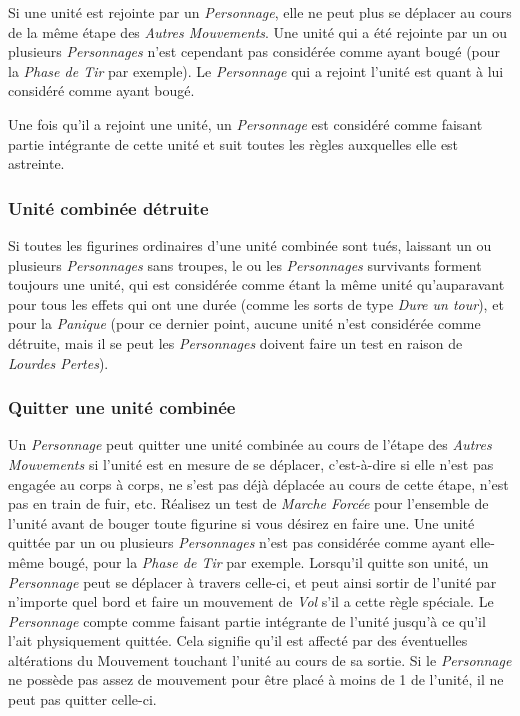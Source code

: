 Si une unité est rejointe par un \emph{Personnage}, elle ne peut plus se déplacer au cours de la même étape des \emph{Autres Mouvements}. Une unité qui a été rejointe par un ou plusieurs \emph{Personnages} n'est cependant pas considérée comme ayant bougé (pour la \emph{Phase de Tir} par exemple). Le \emph{Personnage} qui a rejoint l'unité est quant à lui considéré comme ayant bougé.

Une fois qu'il a rejoint une unité, un \emph{Personnage} est considéré comme faisant partie intégrante de cette unité et suit toutes les règles auxquelles elle est astreinte.

\subsubsection*{Unité combinée détruite}

Si toutes les figurines ordinaires d'une unité combinée sont tués, laissant un ou plusieurs \emph{Personnages} sans troupes, le ou les \emph{Personnages} survivants forment toujours une unité, qui est considérée comme étant la même unité qu'auparavant pour tous les effets qui ont une durée (comme les sorts de type \emph{Dure un tour}), et pour la \emph{Panique} (pour ce dernier point, aucune unité n'est considérée comme détruite, mais il se peut les \emph{Personnages} doivent faire un test en raison de \emph{Lourdes Pertes}).

\subsubsection*{Quitter une unité combinée}

Un \emph{Personnage} peut quitter une unité combinée au cours de l'étape des \emph{Autres Mouvements} si l'unité est en mesure de se déplacer, c'est-à-dire si elle n'est pas engagée au corps à corps, ne s'est pas déjà déplacée au cours de cette étape, n'est pas en train de fuir, etc. Réalisez un test de \emph{Marche Forcée} pour l'ensemble de l'unité avant de bouger toute figurine si vous désirez en faire une. Une unité quittée par un ou plusieurs \emph{Personnages} n'est pas considérée comme ayant elle-même bougé, pour la \emph{Phase de Tir} par exemple. Lorsqu'il quitte son unité, un \emph{Personnage} peut se déplacer à travers celle-ci, et peut ainsi sortir de l'unité par n'importe quel bord et faire un mouvement de \emph{Vol} s'il a cette règle spéciale. Le \emph{Personnage} compte comme faisant partie intégrante de l'unité jusqu'à ce qu'il l'ait physiquement quittée. Cela  signifie qu'il est affecté par des éventuelles altérations du Mouvement touchant l'unité au cours de sa sortie. Si le \emph{Personnage} ne possède pas assez de mouvement pour être placé à moins de 1{\pouce} de l'unité, il ne peut pas quitter celle-ci. 

